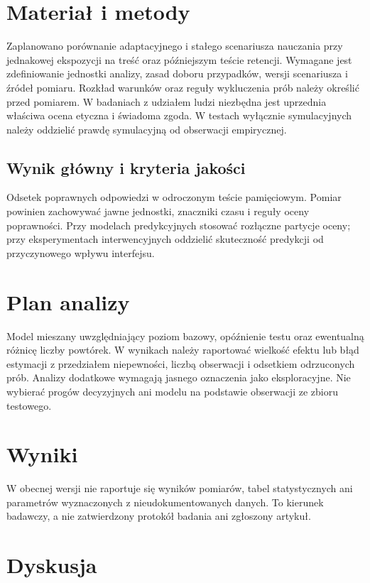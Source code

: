 \documentclass[11pt,a4paper]{article}
\begin{document}
\section{Materiał i metody}

Zaplanowano porównanie adaptacyjnego i stałego scenariusza nauczania przy jednakowej ekspozycji na treść oraz późniejszym teście retencji. Wymagane jest zdefiniowanie jednostki analizy, zasad doboru przypadków, wersji scenariusza i źródeł pomiaru. Rozkład warunków oraz reguły wykluczenia prób należy określić przed pomiarem. W badaniach z udziałem ludzi niezbędna jest uprzednia właściwa ocena etyczna i świadoma zgoda. W testach wyłącznie symulacyjnych należy oddzielić prawdę symulacyjną od obserwacji empirycznej.

\subsection{Wynik główny i kryteria jakości}

Odsetek poprawnych odpowiedzi w odroczonym teście pamięciowym. Pomiar powinien zachowywać jawne jednostki, znaczniki czasu i reguły oceny poprawności. Przy modelach predykcyjnych stosować rozłączne partycje oceny; przy eksperymentach interwencyjnych oddzielić skuteczność predykcji od przyczynowego wpływu interfejsu.

\section{Plan analizy}

Model mieszany uwzględniający poziom bazowy, opóźnienie testu oraz ewentualną różnicę liczby powtórek. W wynikach należy raportować wielkość efektu lub błąd estymacji z przedziałem niepewności, liczbą obserwacji i odsetkiem odrzuconych prób. Analizy dodatkowe wymagają jasnego oznaczenia jako eksploracyjne. Nie wybierać progów decyzyjnych ani modelu na podstawie obserwacji ze zbioru testowego.

\section{Wyniki}

W obecnej wersji nie raportuje się wyników pomiarów, tabel statystycznych ani parametrów wyznaczonych z nieudokumentowanych danych. To kierunek badawczy, a nie zatwierdzony protokół badania ani zgłoszony artykuł.

\section{Dyskusja}
\end{document}
